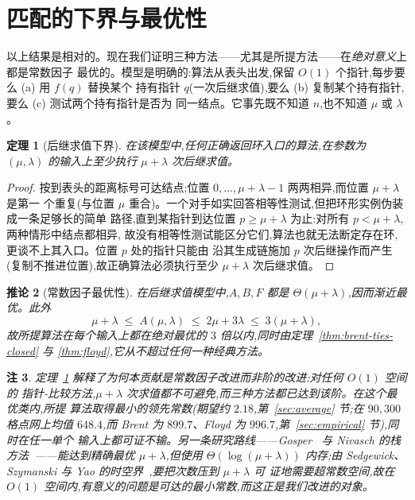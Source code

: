 \documentclass[11pt]{ctexart}
\newtheorem{theorem}{定理}[section]
\newtheorem{corollary}[theorem]{推论}
\newtheorem{remark}[theorem]{注}
\begin{document}
\section{匹配的下界与最优性}
\label{sec:lowerbound}

以上结果是相对的。现在我们证明三种方法——尤其是所提方法——在\emph{绝对意义}上都是常数因子
最优的。模型是明确的:算法从表头出发,保留 $O(1)$ 个指针,每步要么 (a) 用 $f(q)$ 替换某个
持有指针 $q$(一次后继求值),要么 (b) 复制某个持有指针,要么 (c) 测试两个持有指针是否为
同一结点。它事先既不知道 $n$,也不知道 $\mu$ 或 $\lambda$。

\begin{theorem}[后继求值下界]
\label{thm:lowerbound}
在该模型中,任何正确返回环入口的算法,在参数为 $(\mu,\lambda)$ 的输入上至少执行 $\mu+\lambda$
次后继求值。
\end{theorem}

\begin{proof}
按到表头的距离标号可达结点;位置 $0,\dots,\mu+\lambda-1$ 两两相异,而位置 $\mu+\lambda$ 是第一
个重复(与位置 $\mu$ 重合)。一个对手如实回答相等性测试,但把环形实例伪装成一条足够长的简单
路径,直到某指针到达位置 $p\ge\mu+\lambda$ 为止:对所有 $p<\mu+\lambda$,两种情形中结点都相异,
故没有相等性测试能区分它们,算法也就无法断定存在环,更谈不上其入口。位置 $p$ 处的指针只能由
沿其生成链施加 $p$ 次后继操作而产生(复制不推进位置),故正确算法必须执行至少 $\mu+\lambda$
次后继求值。
\end{proof}

\begin{corollary}[常数因子最优性]
\label{cor:optimal}
在后继求值模型中,$A,B,F$ 都是 $\Theta(\mu+\lambda)$,因而渐近最优。此外
\[
\mu+\lambda\;\le\;A(\mu,\lambda)\;\le\;2\mu+3\lambda\;\le\;3(\mu+\lambda),
\]
故所提算法在每个输入上都在绝对最优的 $3$ 倍以内,同时由定理~\ref{thm:brent-ties-closed} 与
\ref{thm:floyd},它从不超过任何一种经典方法。
\end{corollary}

\begin{remark}
定理~\ref{thm:lowerbound} 解释了为何本贡献是常数因子改进而非阶的改进:对任何 $O(1)$ 空间的
指针-比较方法,$\mu+\lambda$ 次求值都不可避免,而三种方法都已达到该阶。在这个最优类内,所提
算法取得最小的领先常数(期望约 $2.18$,第~\ref{sec:average} 节;在 $90{,}300$ 格点网上均值
$648.4$,而 Brent 为 $899.7$、Floyd 为 $996.7$,第~\ref{sec:empirical} 节),同时在任一单个
输入上都可证不输。另一条研究路线——Gosper~\cite{gosper1972} 与 Nivasch 的栈
方法~\cite{nivasch2004}——能达到精确最优 $\mu+\lambda$,但使用 $\Theta(\log(\mu+\lambda))$
内存;由 Sedgewick、Szymanski 与 Yao 的时空界~\cite{ssy1982},要把次数压到 $\mu+\lambda$ 可
证地需要超常数空间,故在 $O(1)$ 空间内,有意义的问题是可达的最小常数,而这正是我们改进的对象。
\end{remark}
\end{document}

